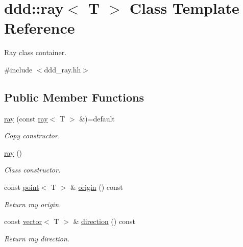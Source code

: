 \hypertarget{classddd_1_1ray}{}\section{ddd\+:\+:ray$<$ T $>$ Class Template Reference}
\label{classddd_1_1ray}


Ray class container.  




{\ttfamily \#include $<$ddd\+\_\+ray.\+hh$>$}

\subsection*{Public Member Functions}
\begin{DoxyCompactItemize}
\item 
\mbox{\label{classddd_1_1ray_a7262ad98c0ba222969241df6e3986f2d}} 
\hyperlink{classddd_1_1ray_a7262ad98c0ba222969241df6e3986f2d}{ray} (const \hyperlink{classddd_1_1ray}{ray}$<$ T $>$ \&)=default
\begin{DoxyCompactList}\small\item\em Copy constructor. \end{DoxyCompactList}\item 
\mbox{\label{classddd_1_1ray_a608816826f457db78e459e7c1f0d5a3a}} 
\hyperlink{classddd_1_1ray_a608816826f457db78e459e7c1f0d5a3a}{ray} ()
\begin{DoxyCompactList}\small\item\em Class constructor. \end{DoxyCompactList}\item 
\mbox{\label{classddd_1_1ray_a92ad567ccc11d6d2bb9faa66cefbb9ca}} 
const \hyperlink{classddd_1_1point}{point}$<$ T $>$ \& \hyperlink{classddd_1_1ray_a92ad567ccc11d6d2bb9faa66cefbb9ca}{origin} () const
\begin{DoxyCompactList}\small\item\em Return ray origin. \end{DoxyCompactList}\item 
\mbox{\label{classddd_1_1ray_a8c6a38d8e1fcda4a44791ad17c99866e}} 
const \hyperlink{classddd_1_1vector}{vector}$<$ T $>$ \& \hyperlink{classddd_1_1ray_a8c6a38d8e1fcda4a44791ad17c99866e}{direction} () const
\begin{DoxyCompactList}\small\item\em Return ray direction. \end{DoxyCompactList}\end{DoxyCompactItemize}


